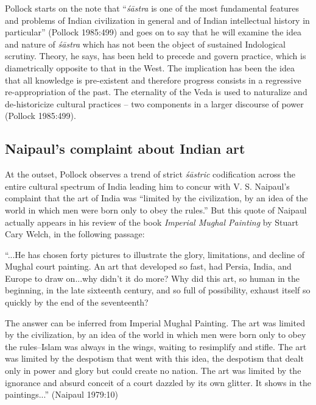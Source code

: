 Pollock starts on the note that ``{\sl śāstra} is one of the most fundamental features and problems of Indian civilization in general and of Indian intellectual history in particular'' (Pollock 1985:499) and goes on to say that he will examine the idea and nature of {\sl śāstra} which has not been the object of sustained Indological scrutiny. Theory, he says, has been held to precede and govern practice, which is diametrically opposite to that in the West. The implication has been the idea that all knowledge is pre-existent and therefore progress consists in a regressive re-appropriation of the past. The eternality of the Veda is used to naturalize and de-historicize cultural practices -- two components in a larger discourse of power (Pollock 1985:499).

\subsection{Naipaul's complaint about Indian art}\label{art12-sec3.2}

At the outset, Pollock observes a trend of strict {\sl śāstric} codiﬁcation across the entire cultural spectrum of India leading him to concur with V. S. Naipaul's complaint that the art of India was ``limited by the civilization, by an idea of the world in which men were born only to obey the rules.'' But this quote of Naipaul actually appears in his review of the book {\sl Imperial Mughal Painting} by Stuart Cary Welch, in the following passage:
\begin{myquote}
``...He has chosen forty pictures to illustrate the glory, limitations, and decline of Mughal court painting. An art that developed so fast, had Persia, India, and Europe to draw on...why didn't it do more? Why did this art, so human in the beginning, in the late sixteenth century, and so full of possibility, exhaust itself so quickly by the end of the seventeenth?

The answer can be inferred from Imperial Mughal Painting. The art was limited by the civilization, by an idea of the world in which men were born only to obey the rules--Islam was always in the wings, waiting to resimplify and stiﬂe. The art was limited by the despotism that went with this idea, the despotism that dealt only in power and glory but could create no nation. The art was limited by the ignorance and absurd conceit of a court dazzled by its own glitter. It shows in the paintings...'' (Naipaul 1979:10)
\end{myquote}

